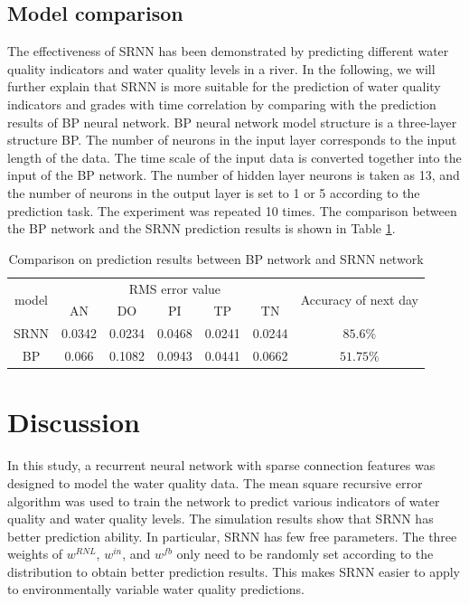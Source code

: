 \documentclass[runningheads]{llncs}
\begin{document}
\subsection{Model comparison}
The effectiveness of SRNN has been demonstrated by predicting 
different water quality indicators and water quality levels in a river. 
In the following, we will further explain that SRNN is more suitable 
for the prediction of water quality indicators and grades with time 
correlation by comparing with the prediction results of BP neural network. 
BP neural network model structure is a three-layer structure BP. The number 
of neurons in the input layer corresponds to the input length of the data. 
The time scale of the input data is converted together into the input of 
the BP network. The number of hidden layer neurons is taken as 13, 
and the number of neurons in the output layer is set to 1 or 5 according 
to the prediction task. The experiment was repeated 10 times. 
The comparison between the BP network and the SRNN prediction results is shown in Table 
\ref{Comparison on prediction results between BP network and SRNN network}.

\begin{table}[htbp] 
\centering
\caption{Comparison on prediction results between BP network and SRNN network}
\label{Comparison on prediction results between BP network and SRNN network}
\begin{tabular}{ccccccc} 
\toprule 
\multirow{2}{*}{model}&\multicolumn{5}{c}{RMS error value}&\multirow{2}{4.25cm}{Accuracy of next day}\\
\cline{2-6}
&AN &DO&PI&TP&TN&\\
\midrule 
SRNN&0.0342&0.0234&0.0468&0.0241&0.0244&$85.6\%$\\
BP&0.066&0.1082&0.0943&0.0441&0.0662&$51.75\%$\\
\bottomrule 
\end{tabular} 
\end{table}

\section{Discussion}
In this study, a recurrent neural network with sparse connection features was 
designed to model the water quality data. The mean square recursive error algorithm 
was used to train the network to predict various indicators of water quality 
and water quality levels. The simulation results show that SRNN has better 
prediction ability. In particular, SRNN has few free parameters. The three 
weights of $w^{RNL}$, $w^{in}$, and $w^{fb}$ only need to be randomly set 
according to the distribution to obtain better prediction results.
This makes SRNN easier to apply to environmentally variable water 
quality predictions.
\end{document}
